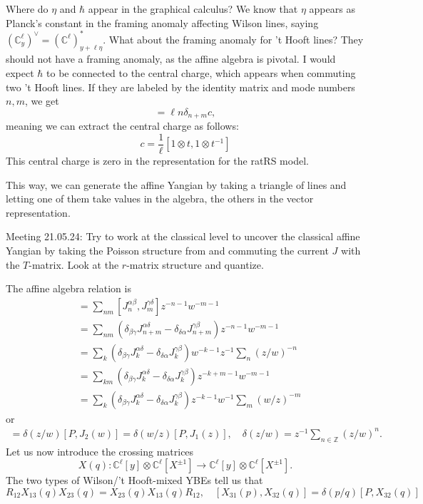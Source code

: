 \documentclass[11pt]{report}
\theoremstyle{definition}
\theoremstyle{remark}
\theoremstyle{remark}
\newcommand{\Z}{\mathbb{Z}}
\newcommand{\C}{\mathbb{C}}
\begin{document}
Where do $\eta$ and $\hbar$ appear in the graphical calculus? We know that $\eta$ appears as Planck's constant in the framing anomaly affecting Wilson lines, saying $(\C_y^\ell)^\vee = (\C^\ell)_{y+\ell\eta}^*$. What about the framing anomaly for 't Hooft lines? They should not have a framing anomaly, as the affine algebra is pivotal. I would expect $\hbar$ to be connected to the central charge, which appears when commuting two 't Hooft lines. If they are labeled by the identity matrix and mode numbers $n,m$, we get
\begin{equation*}
[1 \otimes t^n,1 \otimes t^m] = \ell n \delta_{n+m} c,
\end{equation*}
meaning we can extract the central charge as follows:
\begin{equation*}
c = \frac{1}{\ell} [1 \otimes t, 1 \otimes t^{-1}]
\end{equation*}
This central charge is zero in the representation for the ratRS model.

This way, we can generate the affine Yangian by taking a triangle of lines and letting one of them take values in the algebra, the others in the vector representation.

Meeting 21.05.24: Try to work at the classical level to uncover the classical affine Yangian by taking the Poisson structure from \cite{article:arutyunov:1998} and commuting the current $J$ with the $T$-matrix. Look at the $r$-matrix structure and quantize.

The affine algebra relation is
\begin{align*}
[J^{\alpha\beta}(z),J^{\gamma\delta}(w)]
&= \sum_{nm} [J_n^{\alpha\beta},J_m^{\gamma\delta}] z^{-n-1} w^{-m-1} \\
&= \sum_{nm} (\delta_{\beta\gamma} J_{n+m}^{\alpha\delta} - \delta_{\delta\alpha} J_{n+m}^{\gamma\beta}) z^{-n-1} w^{-m-1} \\
&= \sum_k (\delta_{\beta\gamma} J_k^{\alpha\delta} - \delta_{\delta\alpha} J_k^{\gamma\beta}) w^{-k-1} z^{-1} \sum_n (z/w)^{-n} \\
&= \sum_{km} (\delta_{\beta\gamma} J_k^{\alpha\delta} - \delta_{\delta\alpha} J_k^{\gamma\beta}) z^{-k+m-1} w^{-m-1} \\
&= \sum_k (\delta_{\beta\gamma} J_k^{\alpha\delta} - \delta_{\delta\alpha} J_k^{\gamma\beta}) z^{-k-1} w^{-1} \sum_m (w/z)^{-m}
\end{align*}
or
\begin{align*}
[J_1(z),J_2(w)] = \delta(z/w) [P,J_2(w)] = \delta(w/z) [P,J_1(z)], \quad \delta(z/w) = z^{-1} \sum_{n \in \Z} (z/w)^n.
\end{align*}
Let us now introduce the crossing matrices
\begin{equation*}
X(q): \C^\ell[y] \otimes \C^\ell[X^{\pm 1}] \to \C^\ell[y] \otimes \C^\ell[X^{\pm 1}].
\end{equation*}
The two types of Wilson/'t Hooft-mixed YBEs tell us that
\begin{equation*}
R_{12} X_{13}(q) X_{23}(q) = X_{23}(q) X_{13}(q) R_{12}, \quad
[X_{31}(p),X_{32}(q)] = \delta(p/q)[P,X_{32}(q)]
\end{equation*}
\end{document}
